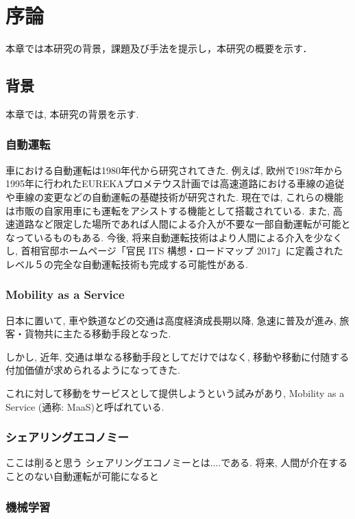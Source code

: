 \chapter{序論}
\label{introduction}

本章では本研究の背景，課題及び手法を提示し，本研究の概要を示す．


\section{背景}
\label{introduction:background}

本章では, 本研究の背景を示す.

\subsection{自動運転}

車における自動運転は1980年代から研究されてきた.
例えば, 欧州で1987年から1995年に行われたEUREKAプロメテウス計画では高速道路における車線の追従や車線の変更などの自動運転の基礎技術が研究された.
現在では, これらの機能は市販の自家用車にも運転をアシストする機能として搭載されている. また, 高速道路など限定した場所であれば人間による介入が不要な一部自動運転が可能となっているものもある.
今後, 将来自動運転技術はより人間による介入を少なくし, 首相官邸ホームページ「官民 ITS 構想・ロードマップ 2017」に定義されたレベル５の完全な自動運転技術も完成する可能性がある.


\subsection{Mobility as a Service}

日本に置いて, 車や鉄道などの交通は高度経済成長期以降, 急速に普及が進み, 旅客・貨物共に主たる移動手段となった. 

しかし, 近年, 交通は単なる移動手段としてだけではなく, 移動や移動に付随する付加価値が求められるようになってきた.

これに対して移動をサービスとして提供しようという試みがあり, Mobility as a Service (通称: MaaS)と呼ばれている.

\subsection{シェアリングエコノミー}

ここは削ると思う
シェアリングエコノミーとは....である. 将来, 人間が介在することのない自動運転が可能になると

\subsection{機械学習}

